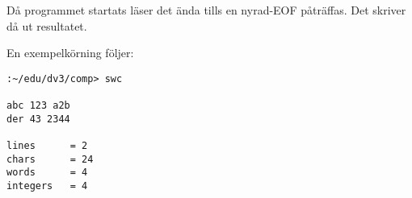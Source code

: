 \documentclass[10pt, titlepage, oneside, a4paper]{article}
\begin{document}
	Då programmet startats läser det ända tills en nyrad-EOF påträffas. Det skriver då ut resultatet.
	
	En exempelkörning följer:
	
\begin{verbatim}
:~/edu/dv3/comp> swc

abc 123 a2b
der 43 2344

lines      = 2
chars      = 24
words      = 4
integers   = 4
\end{verbatim}
		
		
								  \setlength{\parindent}{0pt}
								  \setlength{\parskip}{10pt}


	\newpage
	\appendix
\end{document}
